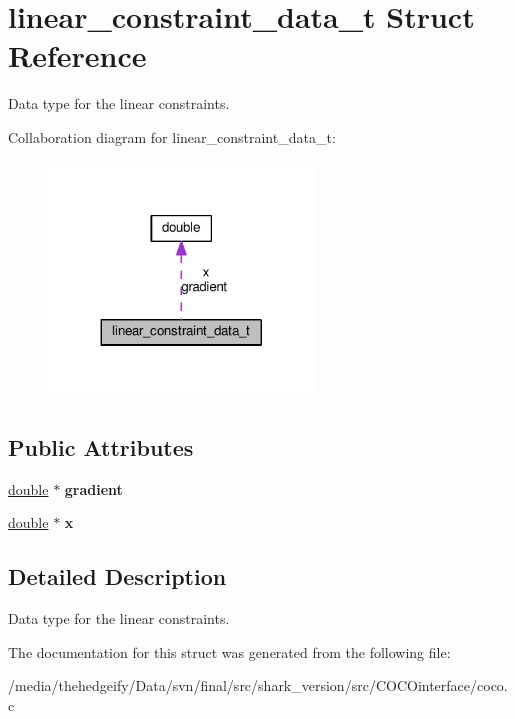 \hypertarget{structlinear__constraint__data__t}{}\section{linear\+\_\+constraint\+\_\+data\+\_\+t Struct Reference}
\label{structlinear__constraint__data__t}


Data type for the linear constraints.  




Collaboration diagram for linear\+\_\+constraint\+\_\+data\+\_\+t\+:\nopagebreak
\begin{figure}[H]
\begin{center}
\leavevmode
\includegraphics[width=200pt]{structlinear__constraint__data__t__coll__graph}
\end{center}
\end{figure}
\subsection*{Public Attributes}
\begin{DoxyCompactItemize}
\item 
\hyperlink{classdouble}{double} $\ast$ {\bfseries gradient}\hypertarget{structlinear__constraint__data__t_af0849c2da95b86debdaec1af1030e2fd}{}\label{structlinear__constraint__data__t_af0849c2da95b86debdaec1af1030e2fd}

\item 
\hyperlink{classdouble}{double} $\ast$ {\bfseries x}\hypertarget{structlinear__constraint__data__t_af209977ee707d39aeb8823d0388cc46c}{}\label{structlinear__constraint__data__t_af209977ee707d39aeb8823d0388cc46c}

\end{DoxyCompactItemize}


\subsection{Detailed Description}
Data type for the linear constraints. 

The documentation for this struct was generated from the following file\+:\begin{DoxyCompactItemize}
\item 
/media/thehedgeify/\+Data/svn/final/src/shark\+\_\+version/src/\+C\+O\+C\+Ointerface/coco.\+c\end{DoxyCompactItemize}
